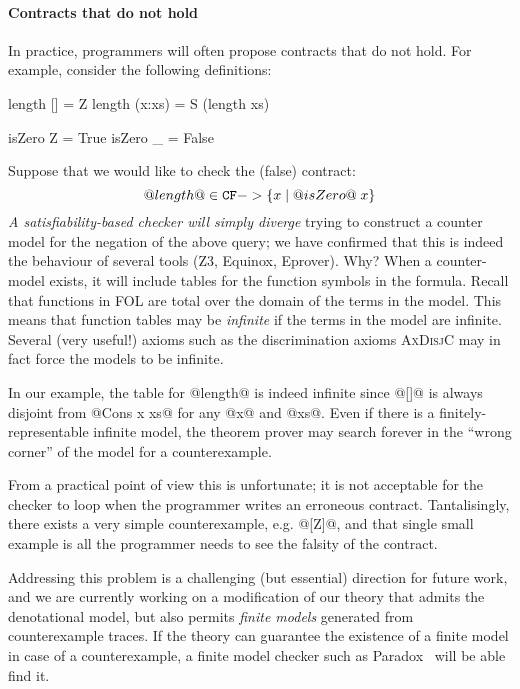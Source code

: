 \paragraph{Contracts that do not hold}
\label{ssect:countersat}

In practice, programmers will often propose contracts that do not hold. 
For example, consider the following definitions:
\begin{code}
  length []     = Z
  length (x:xs) = S (length xs)

  isZero Z = True
  isZero _ = False
\end{code}
Suppose that we would like to check the (false) contract:
   \[ @length@ \in {\tt CF} -> \{ x \mid @isZero@\;x\} \]
\emph{A satisfiability-based checker 
will simply diverge} trying to construct a counter model for the
negation of the above query; we have confirmed that this is indeed the
behaviour of several tools (Z3, Equinox, Eprover).  Why?  When a
counter-model exists, it will include tables for the function symbols
in the formula. Recall that functions in FOL are total over the domain
of the terms in the model. This means that function tables may be {\em
infinite} if the terms in the model are infinite. Several (very
useful!)  axioms such as the discrimination axioms \textsc{AxDisjC}
may in fact force the models to be infinite.

In our example, the table for @length@ is indeed infinite since @[]@ is
always disjoint from @Cons x xs@ for any @x@ and @xs@. Even if there
is a finitely-representable infinite model, the theorem prover may
search forever in the ``wrong corner'' of the model for a
counterexample.

From a practical point of view this is unfortunate; it is not
acceptable for the checker to loop when the programmer writes an
erroneous contract.  Tantalisingly, there exists a very simple
counterexample, e.g. @[Z]@, and that single small example is all the
programmer needs to see the falsity of the contract.

Addressing this problem is a challenging (but essential) 
direction for future work, and we are currently 
working on a modification of our theory that admits the denotational model, but 
also permits {\em finite models} generated from counterexample traces.
If the theory can guarantee the existence of a finite model in case of a counterexample,
a finite model checker such as Paradox~\cite{paradox} will be able find it.

